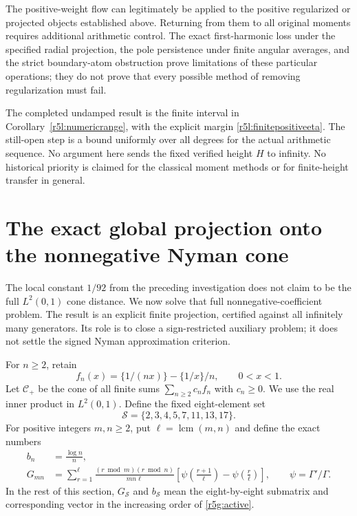 \documentclass[11pt,a4paper]{article}
\theoremstyle{definition}\newtheorem{definition}[theorem]{Definition}
\theoremstyle{remark}\newtheorem{remark}[theorem]{Remark}
\numberwithin{equation}{section}
\begin{document}
The positive-weight flow can legitimately be applied to the positive
regularized or projected objects established above.  Returning from
them to all original moments requires additional arithmetic control.
The exact first-harmonic loss under the specified radial projection,
the pole persistence under finite angular averages, and the strict
boundary-atom obstruction prove limitations of these particular
operations; they do not prove that every possible method of removing
regularization must fail.

The completed undamped result is the finite interval in
Corollary~\ref{r5l:numericrange}, with the explicit margin
\eqref{r5l:finitepositiveeta}.  The still-open step is a bound
uniformly over all degrees for the actual arithmetic sequence.
No argument here sends the fixed verified height $H$ to infinity.
No historical priority is claimed for the classical moment methods
or for finite-height transfer in general.

\section{The exact global projection onto the nonnegative Nyman cone}
\label{r5g:section}

The local constant $1/92$ from the preceding investigation does not
claim to be the full $L^2(0,1)$ cone distance. We now solve that full
nonnegative-coefficient problem. The result is an explicit finite
projection, certified against all infinitely many generators. Its
role is to close a sign-restricted auxiliary problem; it does not
settle the signed Nyman approximation criterion.

For $n\ge2$, retain
\[
 f_n(x)=\{1/(nx)\}-\{1/x\}/n,\qquad 0<x<1.
\]
Let $\mathcal C_+$ be the cone of all finite sums $\sum_{n\ge2}c_nf_n$
with $c_n\ge0$. We use the real inner product in $L^2(0,1)$.
Define the fixed eight-element set
\begin{equation}\label{r5g:active}
 \mathcal S=\{2,3,4,5,7,11,13,17\}.
\end{equation}
For positive integers $m,n\ge2$, put $\ell=\operatorname{lcm}(m,n)$
and define the exact numbers
\begin{align}
 b_n&=\frac{\log n}{n},\label{r5g:b}\\
 G_{mn}&=\sum_{r=1}^{\ell}
  \frac{(r\bmod m)(r\bmod n)}{mn\ell}
  \left[\psi\left(\frac{r+1}{\ell}\right)
              -\psi\left(\frac r\ell\right)\right],
 \qquad \psi=\Gamma'/\Gamma.\label{r5g:G}
\end{align}
In the rest of this section, $G_{\mathcal S}$ and $b_{\mathcal S}$
mean the eight-by-eight submatrix and corresponding vector in the
increasing order of \eqref{r5g:active}.
\end{document}
